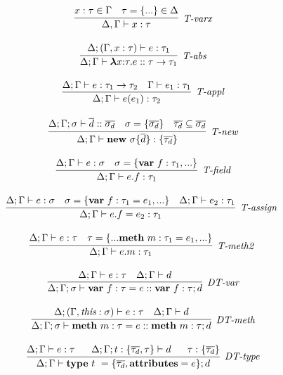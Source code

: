 \begin{figure}
\centering
\[
\begin{array}{c}

\infer[\textit{T-varx}]
	{\Delta,\Gamma \vdash x:\tau } 
	{x:\tau \in \Gamma & \tau= \{...\} \in \Delta}\\[3ex]

\infer[\textit{T-abs}]
	{\Delta; \Gamma \vdash  \boldsymbol\lambda x{:}\tau . e :: \tau \rightarrow \tau_1} 
	{\Delta; (\Gamma, x:\tau) \vdash e:\tau_1 }\\[3ex]

\infer[\textit{T-appl}]
	{\Delta; \Gamma \vdash  e(e_1):\tau_2} 
	{\Delta; \Gamma \vdash e:\tau_1 \rightarrow \tau_2 & \Gamma \vdash e_1:\tau_1}\\[3ex]

\infer[\textit{T-new}]
	{\Delta; \Gamma \vdash \keyw{new}~\sigma \{ \overline{d} \} : \{ \overline{\tau_d} \}}
	{\Delta; \Gamma; \sigma \vdash \overline{d} :: \overline{\sigma_d} & \sigma = \{ \overline{\sigma_d} \} & \overline{\tau_d} \subseteq \overline{\sigma_d}} \\[3ex]

\infer[\textit{T-field}]
	{\Delta; \Gamma \vdash  e.f:\tau_1} 
	{\Delta; \Gamma \vdash e:\sigma & \sigma= \{\keyw{var}~ f:\tau_1,... \} }\\[3ex]

\infer[\textit{T-assign }]
	{\Delta; \Gamma \vdash  e.f=e_2:\tau_1} 
	{\Delta; \Gamma \vdash e:\sigma & \sigma= \{\keyw{var}~ f:\tau_1=e_1,... \} & \Delta; \Gamma\vdash e_2:\tau_1 }\\[3ex]

\infer[\textit{T-meth2 }]
	{\Delta; \Gamma \vdash  e.m:\tau_1} 
	{\Delta; \Gamma \vdash e:\tau & \tau=\{...\keyw{meth}~ m:\tau_1=e_1,... \} }\\[3ex]

\infer[\textit{DT-var}]
	{\Delta; \Gamma; \sigma \vdash \keyw{var}~ f:\tau = e :: \keyw{var}~ f:\tau; d }
	{\Delta; \Gamma \vdash e : \tau & \Delta; \Gamma \vdash d} \\[3ex]
	
\infer[\textit{DT-meth}]
	{\Delta; \Gamma; \sigma \vdash \keyw{meth}~ m:\tau = e :: \keyw{meth}~ m:\tau; d }
	{\Delta; (\Gamma, \textit{this}:\sigma) \vdash e : \tau & \Delta; \Gamma \vdash d } \\[3ex]

\infer[\textit{DT-type}]
	{\Delta; \Gamma \vdash  \keyw{type}~ t~=\{\overline{\tau_d}, \keyw{attributes}=e\}; d} 
	{\Delta; \Gamma \vdash e:\tau ~~~~~ \Delta; \Gamma; t:\{\overline{\tau_d},\tau\} \vdash d ~~~~~ \tau: \{\overline{\tau_d}\}  }\\[3ex]


\end{array}\]
\end{figure}
